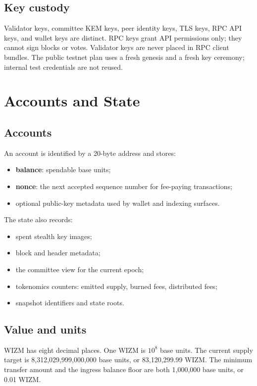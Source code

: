 \documentclass[11pt,a4paper]{article}
\begin{document}
\subsection{Key custody}

Validator keys, committee KEM keys, peer identity keys, TLS keys, RPC API
keys, and wallet keys are distinct. RPC keys grant API permissions only; they
cannot sign blocks or votes. Validator keys are never placed in RPC client
bundles. The public testnet plan uses a fresh genesis and a fresh key
ceremony; internal test credentials are not reused.

\section{Accounts and State}

\subsection{Accounts}

An account is identified by a 20-byte address and stores:
\begin{itemize}[leftmargin=*]
  \item \textbf{balance}: spendable base units;
  \item \textbf{nonce}: the next accepted sequence number for fee-paying
        transactions;
  \item optional public-key metadata used by wallet and indexing surfaces.
\end{itemize}

The state also records:
\begin{itemize}[leftmargin=*]
  \item spent stealth key images;
  \item block and header metadata;
  \item the committee view for the current epoch;
  \item tokenomics counters: emitted supply, burned fees, distributed fees;
  \item snapshot identifiers and state roots.
\end{itemize}

\subsection{Value and units}

WIZM has eight decimal places. One WIZM is $10^8$ base units. The current
supply target is 8,312,029,999,000,000 base units, or 83,120,299.99 WIZM. The
minimum transfer amount and the ingress balance floor are both 1,000,000 base
units, or 0.01 WIZM.
\end{document}

